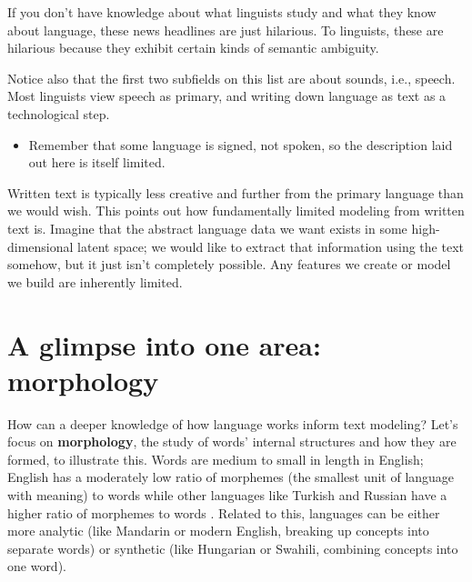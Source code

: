 \documentclass[
]{krantz}
\newenvironment{rmdblock}[1]
  {\begin{shaded*}
  \begin{itemize}[left = -1cm, labelsep = 1cm]
  \renewcommand{\labelitemi}{
    \raisebox{-.7\height}[0pt][0pt]{
      {\setkeys{Gin}{width=3em,keepaspectratio}\texttt{[image: images/\#1]}}
    }
  }
 
  \item
  }
  {
  \end{itemize}
  \end{shaded*}
  }
\newenvironment{rmdnote}
  {\begin{rmdblock}{note}}
  {\end{rmdblock}}
\begin{document}
If you don't have knowledge about what linguists study and what they know about language, these news headlines are just hilarious. To linguists, these are hilarious because they exhibit certain kinds of semantic ambiguity.

Notice also that the first two subfields on this list are about sounds, i.e., speech. Most linguists view speech as primary, and writing down language as text as a technological step.

\begin{rmdnote}
Remember that some language is signed, not spoken, so the description
laid out here is itself limited.
\end{rmdnote}


Written text is typically less creative and further from the primary language than we would wish. This points out how fundamentally limited modeling from written text is. Imagine that the abstract language data we want exists in some high-dimensional latent space; we would like to extract that information using the text somehow, but it just isn't completely possible. Any features we create or model we build are inherently limited.

\hypertarget{morphology}{%
\section{A glimpse into one area: morphology}\label{morphology}}

How can a deeper knowledge of how language works inform text modeling? Let's focus on \textbf{morphology}, the study of words' internal structures and how they are formed, to illustrate this. Words are medium to small in length in English; English has a moderately low ratio of morphemes (the smallest unit of language with meaning) to words while other languages like Turkish and Russian have a higher ratio of morphemes to words \citep{Bender13}. Related to this, languages can be either more analytic (like Mandarin or modern English, breaking up concepts into separate words) or synthetic (like Hungarian or Swahili, combining concepts into one word).
\end{document}
